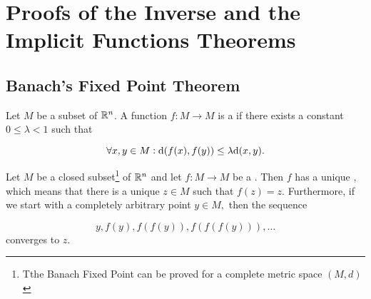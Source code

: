 \chapter{ Proofs of the Inverse and the Implicit Functions Theorems} \label{sec:proof-inverse-implicit}
% 

\section{Banach's Fixed Point Theorem}\label{banachs-fixed-point-theorem}

\begin{df}
 Let $M$  be a  subset  of $\mathbb{R}^n$.  A function \(f: M \to M\) is  a
 if  there exists a constant
\(0 \le \lambda < 1\) such that

\[\forall x, y \in M: \mathrm d(f(x), f(y)) \le \lambda \mathrm d(x, y).\]
\end{df}




\begin{thm}
 Let $M$  be a closed subset\footnote{Tthe Banach Fixed Point can be proved for a  complete metric space  \((M,d)\)} of $\mathbb{R}^n$ and let \(f: M \to M\) be a
.  Then \(f\)
has a unique , which means that there is a unique
\(z \in M\) such that \(f(z) = z\). Furthermore, if we start with a
completely arbitrary point \(y \in M,\) then the sequence

\[y, f(y), f(f(y)), f(f(f(y))), \ldots\] converges to \(z\).
\end{thm}

